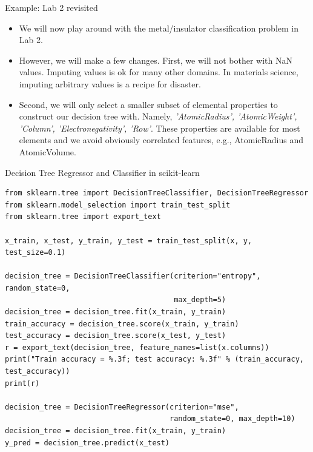 \documentclass{beamer}
\begin{document}
\begin{frame}{Example: Lab 2 revisited}
    \begin{itemize}
        \item We will now play around with the metal/insulator classification problem in Lab 2.
        \item However, we will make a few changes. First, we will not bother with NaN values. Imputing values is ok for many other domains. In materials science, imputing arbitrary values is a recipe for disaster.
        \item Second, we will only select a smaller subset of elemental properties to construct our decision tree with. Namely, \textit{'AtomicRadius', 'AtomicWeight', 'Column', 'Electronegativity', 'Row'}. These properties are available for most elements and we avoid obviously correlated features, e.g., AtomicRadius and AtomicVolume.
    \end{itemize}
\end{frame}


\begin{frame}[fragile]{Decision Tree Regressor and Classifier in scikit-learn}
\begin{verbatim}
from sklearn.tree import DecisionTreeClassifier, DecisionTreeRegressor
from sklearn.model_selection import train_test_split
from sklearn.tree import export_text

x_train, x_test, y_train, y_test = train_test_split(x, y, test_size=0.1)

decision_tree = DecisionTreeClassifier(criterion="entropy", random_state=0, 
                                       max_depth=5)
decision_tree = decision_tree.fit(x_train, y_train)
train_accuracy = decision_tree.score(x_train, y_train)
test_accuracy = decision_tree.score(x_test, y_test)
r = export_text(decision_tree, feature_names=list(x.columns))
print("Train accuracy = %.3f; test accuracy: %.3f" % (train_accuracy, test_accuracy))
print(r)

decision_tree = DecisionTreeRegressor(criterion="mse", 
                                      random_state=0, max_depth=10)
decision_tree = decision_tree.fit(x_train, y_train)
y_pred = decision_tree.predict(x_test)
\end{verbatim}
\end{frame}
\end{document}
